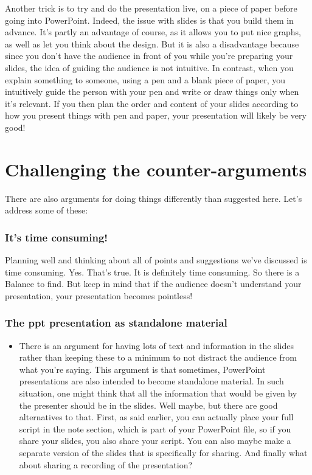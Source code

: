 \documentclass[
]{book}
\providecommand{\tightlist}{%
  \setlength{\itemsep}{0pt}\setlength{\parskip}{0pt}}
\begin{document}
Another trick is to try and do the presentation live, on a piece of paper before going into PowerPoint. Indeed, the issue with slides is that you build them in advance. It's partly an advantage of course, as it allows you to put nice graphs, as well as let you think about the design. But it is also a disadvantage because since you don't have the audience in front of you while you're preparing your slides, the idea of guiding the audience is not intuitive. In contrast, when you explain something to someone, using a pen and a blank piece of paper, you intuitively guide the person with your pen and write or draw things only when it's relevant. If you then plan the order and content of your slides according to how you present things with pen and paper, your presentation will likely be very good!

\hypertarget{challenging-the-counter-arguments}{%
\section{Challenging the counter-arguments}\label{challenging-the-counter-arguments}}

There are also arguments for doing things differently than suggested here. Let's address some of these:

\hypertarget{its-time-consuming}{%
\subsubsection{It's time consuming!}\label{its-time-consuming}}

Planning well and thinking about all of points and suggestions we've discussed is time consuming. Yes. That's true. It is definitely time consuming. So there is a Balance to find. But keep in mind that if the audience doesn't understand your presentation, your presentation becomes pointless!

\hypertarget{the-ppt-presentation-as-standalone-material}{%
\subsubsection{The ppt presentation as standalone material}\label{the-ppt-presentation-as-standalone-material}}

\begin{itemize}
\tightlist
\item
  There is an argument for having lots of text and information in the slides rather than keeping these to a minimum to not distract the audience from what you're saying. This argument is that sometimes, PowerPoint presentations are also intended to become standalone material. In such situation, one might think that all the information that would be given by the presenter should be in the slides. Well maybe, but there are good alternatives to that. First, as said earlier, you can actually place your full script in the note section, which is part of your PowerPoint file, so if you share your slides, you also share your script. You can also maybe make a separate version of the slides that is specifically for sharing. And finally what about sharing a recording of the presentation?
\end{itemize}
\end{document}
